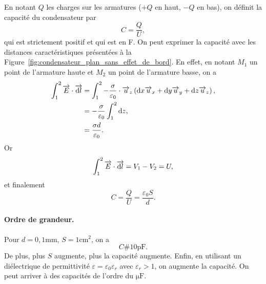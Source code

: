             En notant $Q$ les charges sur les armatures ($+Q$ en haut, $-Q$ en bas), on définit la capacité du condensateur par 
            \begin{equation}
                \boxed{
                    C=\frac{Q}{U},
                }
            \end{equation}
            qui est strictement positif et qui est en \si{\farad}. On peut exprimer la capacité avec les distances caractéristiques présentées à la Figure~\ref{fig:condensateur_plan_sans_effet_de_bord}. En effet, en notant $M_1$ un point de l'armature haute et $M_2$ un point de l'armature basse, on a 
            \begin{align}
                \int_{1}^{2}\protect\overrightarrow{{E}}\cdot\protect\overrightarrow{{\mathrm{d} l}}
                &=
                \int_{1}^{2}-\frac{\sigma}{\varepsilon_0}\cdot\protect\overrightarrow{{u}}_z\left(\mathrm{d} x\protect\overrightarrow{{u}}_x+\mathrm{d} y\protect\overrightarrow{{u}}_y+\mathrm{d} z\protect\overrightarrow{{u}}_z\right),\\
                &=
                -\frac{\sigma}{\varepsilon_0}\int_{1}^{2}\mathrm{d} z,\\
                &=
                \frac{\sigma d}{\varepsilon_0}.
            \end{align}
            Or 
            \begin{equation}
                \int_{1}^{2}\protect\overrightarrow{{E}}\cdot\protect\overrightarrow{{\mathrm{d} l}}=V_1-V_2=U,
            \end{equation}
            et finalement
            \begin{equation}
                \boxed{
                    C=\frac{Q}{U}=\frac{\varepsilon_0 S}{d}.
                }
            \end{equation}

            \paragraph{Ordre de grandeur.} Pour $d=0,1\si{\milli\metre}$, $S=1\si{\centi\metre\squared}$, on a 
            \begin{equation}
                C\#10\si{\pico\farad}.
            \end{equation}
            De plus, plus $S$ augmente, plus la capacité augmente. Enfin, en utilisant un diélectrique de permittivité $\varepsilon=\varepsilon_0\varepsilon_r$ avec $\varepsilon_r>1$, on augmente la capacité. On peut arriver à des capacités de l'ordre du $\si{\micro\farad}$.